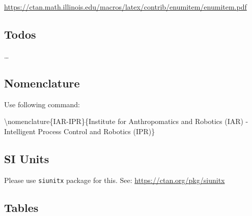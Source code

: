 \url{https://ctan.math.illinois.edu/macros/latex/contrib/enumitem/enumitem.pdf}

\subsection{Todos}

\dots
{}

\subsection{Nomenclature}
Use following command:

\textbackslash nomenclature\{IAR-IPR\}\{Institute for Anthropomatics and Robotics (IAR) - Intelligent Process Control and Robotics (IPR)\}

\subsection{SI Units}
Please use \texttt{siunitx} package for this. See:  \url{https://ctan.org/pkg/siunitx}

\subsection{Tables}
\begin{table}[H]
\caption{Tables have caption on top.}
\label{tab:table_caption}
\centering
{}
\end{table}

